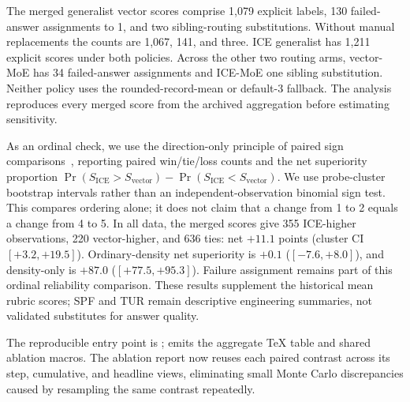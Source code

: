 \documentclass[twoside,11pt]{article}
\begin{document}
The merged generalist vector scores comprise 1,079 explicit labels, 130 failed-answer assignments to 1, and two sibling-routing substitutions. Without manual replacements the counts are 1,067, 141, and three. ICE generalist has 1,211 explicit scores under both policies. Across the other two routing arms, vector-MoE has 34 failed-answer assignments and ICE-MoE one sibling substitution. Neither policy uses the rounded-record-mean or default-3 fallback. The analysis reproduces every merged score from the archived aggregation before estimating sensitivity.

As an ordinal check, we use the direction-only principle of paired sign comparisons~\citep{nistSignTest}, reporting paired win/tie/loss counts and the net superiority proportion $\Pr(S_{\mathrm{ICE}}>S_{\mathrm{vector}})-\Pr(S_{\mathrm{ICE}}<S_{\mathrm{vector}})$. We use probe-cluster bootstrap intervals rather than an independent-observation binomial sign test. This compares ordering alone; it does not claim that a change from 1 to 2 equals a change from 4 to 5. In all data, the merged scores give 355 ICE-higher observations, 220 vector-higher, and 636 ties: net $+11.1$ points (cluster CI $[+3.2,+19.5]$). Ordinary-density net superiority is $+0.1$ ($[-7.6,+8.0]$), and density-only is $+87.0$ ($[+77.5,+95.3]$). Failure assignment remains part of this ordinal reliability comparison. These results supplement the historical mean rubric scores; SPF and TUR remain descriptive engineering summaries, not validated substitutes for answer quality.

The reproducible entry point is ;  emits the aggregate TeX table and shared ablation macros. The ablation report now reuses each paired contrast across its step, cumulative, and headline views, eliminating small Monte Carlo discrepancies caused by resampling the same contrast repeatedly.


\end{document}

